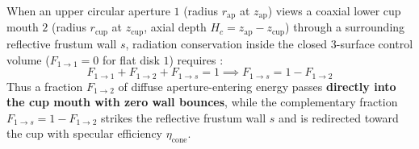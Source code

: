 \begin{derivation}
When an upper circular aperture $1$ (radius $r_{\mathrm{ap}}$ at $z_{\mathrm{ap}}$) views a coaxial lower cup mouth $2$ (radius $r_{\mathrm{cup}}$ at $z_{\mathrm{cup}}$, axial depth $H_c = z_{\mathrm{ap}} - z_{\mathrm{cup}}$) through a surrounding reflective frustum wall $s$, radiation conservation inside the closed 3-surface control volume ($F_{1\to 1} = 0$ for flat disk $1$) requires :
\[
  F_{1\to 1} + F_{1\to 2} + F_{1\to s} = 1 \implies \boxed{F_{1\to s} = 1 - F_{1\to 2}}
\]
Thus a fraction $F_{1\to 2}$ of diffuse aperture-entering energy passes \textbf{directly into the cup mouth with zero wall bounces}, while the complementary fraction $F_{1\to s} = 1 - F_{1\to 2}$ strikes the reflective frustum wall $s$ and is redirected toward the cup with specular efficiency $\eta_{\mathrm{cone}}$.
\end{derivation}

